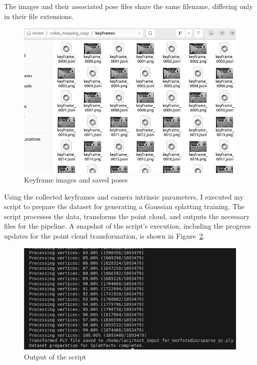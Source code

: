 The images and their associated pose files share the same filename, differing only in their file extensions.

\begin{figure}[htbp]
	\centering
	\includegraphics[width=150mm, keepaspectratio]{figures_jpg/mapping_keyframe_folder.jpg}
	\caption{Keyframe images and saved poses}
	\label{fig:mapping_keyframe_folder}
\end{figure}

Using the collected keyframes and camera intrinsic parameters, I executed my script to prepare the dataset for generating a Gaussian splatting training. The script processes the data, transforms the point cloud, and outputs the necessary files for the pipeline. A snapshot of the script's execution, including the progress updates for the point cloud transformation, is shown in Figure~\ref{fig:create_splatfacto_script_cli}.

\begin{figure}[htbp]
	\centering
	\includegraphics[width=150mm, keepaspectratio]{figures_jpg/create_splatfacto_script_cli.jpg}
	\caption{Output of the script}
	\label{fig:create_splatfacto_script_cli}
\end{figure}

